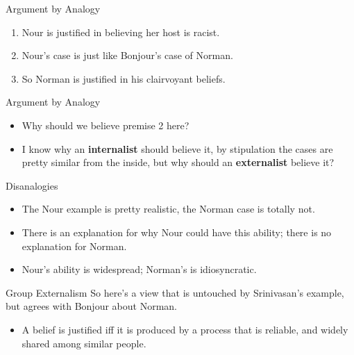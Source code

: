 \documentclass[
  17pt,
  letterpaper,
  ignorenonframetext,
  aspectratio=169,
]{beamer}
\providecommand{\tightlist}{%
  \setlength{\itemsep}{0pt}\setlength{\parskip}{0pt}}\usepackage{longtable,booktabs,array}
\begin{document}
\begin{frame}{Argument by Analogy}
\protect\hypertarget{argument-by-analogy}{}
\begin{enumerate}[<+->]
\tightlist
\item
  Nour is justified in believing her host is racist.
\item
  Nour's case is just like Bonjour's case of Norman.
\item
  So Norman is justified in his clairvoyant beliefs.
\end{enumerate}
\end{frame}

\begin{frame}{Argument by Analogy}
\protect\hypertarget{argument-by-analogy-1}{}
\begin{itemize}[<+->]
\tightlist
\item
  Why should we believe premise 2 here?
\item
  I know why an \textbf{internalist} should believe it, by stipulation
  the cases are pretty similar from the inside, but why should an
  \textbf{externalist} believe it?
\end{itemize}
\end{frame}

\begin{frame}{Disanalogies}
\protect\hypertarget{disanalogies}{}
\begin{itemize}[<+->]
\tightlist
\item
  The Nour example is pretty realistic, the Norman case is totally not.
\item
  There is an explanation for why Nour could have this ability; there is
  no explanation for Norman.
\item
  Nour's ability is widespread; Norman's is idiosyncratic.
\end{itemize}
\end{frame}

\begin{frame}{Group Externalism}
\protect\hypertarget{group-externalism}{}
So here's a view that is untouched by Srinivasan's example, but agrees
with Bonjour about Norman.

\begin{itemize}[<+->]
\tightlist
\item
  A belief is justified iff it is produced by a process that is
  reliable, and widely shared among similar people.
\end{itemize}
\end{frame}
\end{document}
